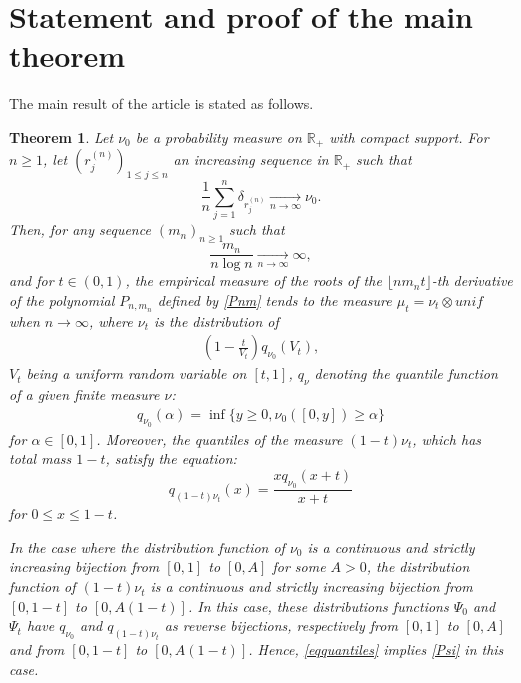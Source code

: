 \documentclass[11pt]{amsart}
\newtheorem{theorem}{Theorem}[section]
\begin{document}
\section{Statement and proof of the main theorem} \label{4} 
The main result of the article is stated as follows. 
\begin{theorem} \label{main}
Let $\nu_0$ be a probability measure on $\mathbb{R}_+$ with compact support. 
For $n \geq 1$, let $(r_j^{(n)})_{1 \leq j \leq n}$ an increasing sequence in $\mathbb{R}_+$ such that
$$\frac{1}{n} \sum_{j=1}^n \delta_{r_j^{(n)}} 
\underset{n \rightarrow \infty}{\longrightarrow}\nu_0.$$
Then, for any sequence $(m_n)_{n \geq 1}$
such that $$\frac{m_n}{n \log n} \underset{n \rightarrow \infty}{\longrightarrow} \infty,$$ and for $t \in (0,1)$, the empirical measure of the roots of the $\lfloor n m_n t \rfloor$-th derivative of the polynomial 
$P_{n,m_n}$ defined by \eqref{Pnm} tends 
to the measure $\mu_t = \nu_t \otimes unif$ when $n \rightarrow \infty$, 
where $\nu_t$ is the distribution 
of 
%
 \begin{align}
 \left(1 - \frac{t}{V_t} \right) q_{\nu_0} (V_t), \label{nuV}
 \end{align}
 $V_t$ being a uniform random variable on $[t,1]$,
$q_{\nu}$ denoting the quantile function of a given finite measure $\nu$: 
\begin{align}
    q_{\nu_0}(\alpha) = \inf \{ y \geq 0, \nu_0 ([0,y]) \geq \alpha \}
\end{align}
for $\alpha \in [0,1]$. 
Moreover, the quantiles of the measure $(1-t)\nu_t$, which has total mass $1-t$, satisfy the 
equation: 
\begin{equation}
    \label{eqquantiles}
 q_{(1-t) \nu_t} (x)  = 
\frac{ x q_{\nu_0}(x+t)}{x+t}
\end{equation}
for $0 \leq x \leq 1-t$. 

In the case where the distribution function 
of $\nu_0$ is a continuous and strictly increasing bijection from $[0,1]$ to  $[0,A]$ for some $A > 0$, the distribution function of $(1-t)\nu_t$ is a continuous and strictly increasing bijection from $[0,1-t]$ to $[0,A(1-t)]$. In this case, these distributions functions $\Psi_0$ and $\Psi_t$ have $q_{\nu_0}$ and $q_{(1-t) \nu_t}$ as reverse bijections, 
respectively from $[0,1]$ to $[0,A]$ and from $[0,1-t]$ to $[0, A(1-t)]$. Hence, \eqref{eqquantiles} implies \eqref{Psi} in this case. 



\end{theorem}
\end{document}
